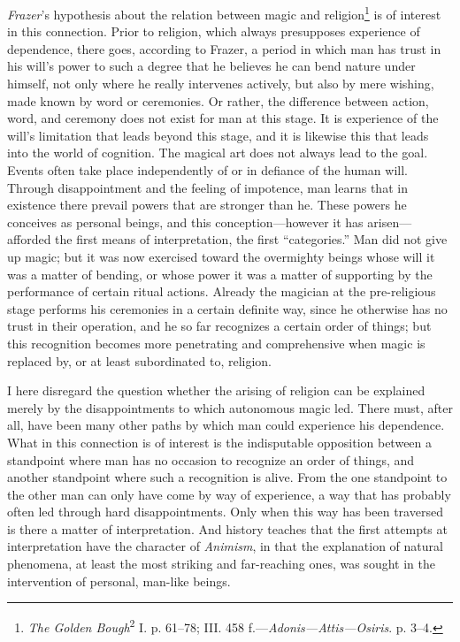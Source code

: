 \documentclass[12pt,a4paper]{book}
\newcommand{\opage}[1]{\marginnote{\footnotesize\textit{[#1]}}}
\begin{document}
\emph{Frazer}'s hypothesis about the relation between magic and
religion\footnote{\emph{The Golden Bough}\textsuperscript{2} I. p.
61--78; III. 458 f.---\emph{Adonis---Attis---Osiris}. p. 3--4.} is of
interest in this connection. Prior to religion, which always presupposes
experience of dependence, there goes, according to Frazer, a period in
which man has trust in his will's power to such a degree that he believes he
can bend nature under himself, not only where he really intervenes
actively, but also by mere wishing, made known \opage{114}by word or ceremonies. Or
rather, the difference between action, word, and ceremony does not exist
for man at this stage. It is experience of the will's limitation that leads
beyond this stage, and it is likewise this that leads into the world of
cognition. The magical art does not always lead to the goal. Events often
take place independently of or in defiance of the human will. Through
disappointment and the feeling of impotence, man learns that in existence
there prevail powers that are stronger than he. These powers he conceives
as personal beings, and this conception---however it has arisen---afforded
the first means of interpretation, the first ``categories.'' Man did not
give up magic; but it was now exercised toward the overmighty beings whose
will it was a matter of bending, or whose power it was a matter of
supporting by the performance of certain ritual actions. Already the
magician at the pre-religious stage performs his ceremonies in a certain
definite way, since he otherwise has no trust in their operation, and he so
far recognizes a certain order of things; but this recognition becomes more
penetrating and comprehensive when magic is replaced by, or at least
subordinated to, religion.

I here disregard the question whether the arising of religion can be
explained merely by the disappointments to which autonomous magic led.
There must, after all, have been many other paths by which man could
experience his dependence. What in this connection is of interest is the
indisputable opposition between a standpoint where man has no occasion to
recognize an order of things, and another standpoint where such a
recognition is alive. From the one standpoint to the other man can only
have come by way of experience, a way that has probably often led through
hard disappointments. Only when this way has been traversed is there a
matter of interpretation. And history teaches that the first attempts at
interpretation have the character of \emph{Animism}, in that the
explanation of natural phenomena, at least the most striking and
far-reaching ones, was sought in the intervention of personal, man-like
beings.
\end{document}
